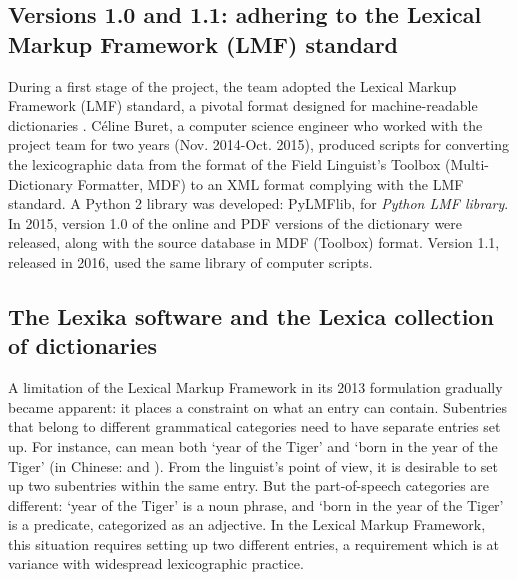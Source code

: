 

\subsection{Versions 1.0 and 1.1: adhering to the Lexical Markup Framework (LMF) standard}

During a first stage of the project, the team adopted the Lexical Markup Framework (LMF) standard, a pivotal format designed for machine-readable dictionaries \parencite{francopoulo2013,romary2013}. Céline Buret, a computer science engineer who worked with the project team for two years (Nov. 2014-Oct. 2015), produced scripts for converting the lexicographic data from the format of the Field Linguist’s Toolbox (Multi-Dictionary Formatter, MDF) to an XML format complying with the LMF standard. A Python 2 library was developed: PyLMFlib, for \emph{Python LMF library}. In 2015, version 1.0 of the online and PDF versions of the dictionary were released, along with the source database in MDF (Toolbox) format. Version 1.1, released in 2016, used the same library of computer scripts.

\subsection{The Lexika software and the Lexica collection of dictionaries}

A limitation of the Lexical Markup Framework in its 2013 formulation gradually became apparent: it places a constraint on what an entry can contain. Subentries that belong to different grammatical categories need to have separate entries set up. For instance,  can mean both ‘year of the Tiger’ and ‘born in the year of the Tiger’ (in Chinese:  and ). From the linguist’s point of view, it is desirable to set up two subentries within the same entry. But the part-of-speech categories are different: ‘year of the Tiger’ is a noun phrase, and ‘born in the year of the Tiger’ is a predicate, categorized as an adjective. In the Lexical Markup Framework, this situation requires setting up two different entries, a requirement which is at variance with widespread lexicographic practice.

